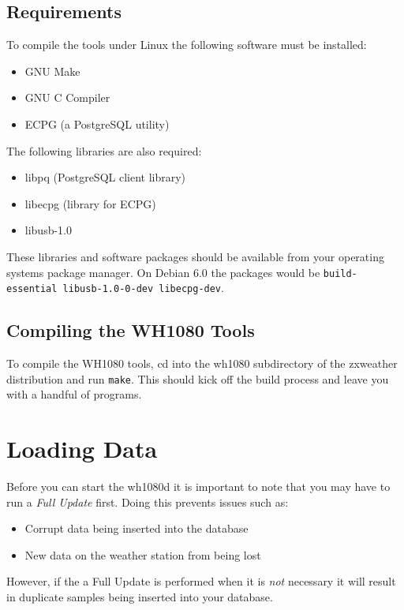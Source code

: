 \documentclass[a4paper,10pt,draft]{book}
\begin{document}
\subsection{Requirements}
To compile the tools under Linux the following software must be installed:
\begin{itemize}
\item GNU Make
\item GNU C Compiler
\item ECPG (a PostgreSQL utility)
\end{itemize}

The following libraries are also required:
\begin{itemize}
\item libpq (PostgreSQL client library)
\item libecpg (library for ECPG)
\item libusb-1.0
\end{itemize}

These libraries and software packages should be available from your operating systems package manager. On Debian 6.0 the packages would be \verb|build-essential libusb-1.0-0-dev libecpg-dev|.

\subsection{Compiling the WH1080 Tools}


To compile the WH1080 tools, cd into the wh1080 subdirectory of the zxweather distribution and run \verb|make|. This should kick off the build process and leave you with a handful of programs.

\section{Loading Data}
\label{sec_loading_data}

Before you can start the wh1080d it is important to note that you may have to run a \emph{Full Update} first. Doing this prevents issues such as:
\begin{itemize}
\item Corrupt data being inserted into the database
\item New data on the weather station from being lost
\end{itemize}

However, if the a Full Update is performed when it is \emph{not} necessary it will result in duplicate samples being inserted into your database.
\end{document}
